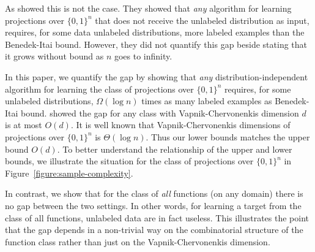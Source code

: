 As \citet{Darnstadt-Simon-Szorenyi-2013} showed this is not the case. They showed
that \emph{any} algorithm for learning projections over $\{0,1\}^n$ that does
not receive the unlabeled distribution as input, requires, for some data
unlabeled distributions, more labeled examples than the Benedek-Itai bound.
However, they did not quantify this gap beside stating that it grows without
bound as $n$ goes to infinity.

In this paper, we quantify the gap by showing that \emph{any}
distribution-independent algorithm for learning the class of projections over
$\{0,1\}^n$ requires, for some unlabeled distributions, $\Omega(\log n)$ times
as many labeled examples as Benedek-Itai bound.
\citet{Darnstadt-Simon-Szorenyi-2013} showed the gap for any class with
Vapnik-Chervonenkis dimension $d$ is at most $O(d)$. It is well known that
Vapnik-Chervonenkis dimensions of projections over $\{0,1\}^n$ is $\Theta(\log
n)$. Thus our lower bounds matches the upper bound $O(d)$. To better understand
the relationship of the upper and lower bounds, we illustrate the situation for
the class of projections over $\{0,1\}^n$ in
Figure~\ref{figure:sample-complexity}.

In contrast, we show that for the class of \emph{all} functions (on any domain)
there is no gap between the two settings. In other words, for learning a target
from the class of all functions, unlabeled data are in fact useless. This
illustrates the point that the gap depends in a non-trivial way on the
combinatorial structure of the function class rather than just on the
Vapnik-Chervonenkis dimension.

